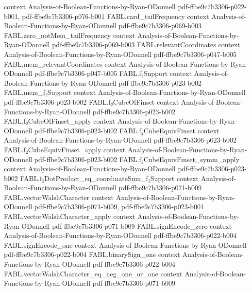 \begin{theorem}
  {context}
  {Analysis-of-Boolean-Functions-by-Ryan-ODonnell}
  {pdf-ffbe9c7b3306-p022-b001,
    pdf-ffbe9c7b3306-p076-b001}
\proofstep
  {FABL.card_tailFrequency}
  {context}
  {Analysis-of-Boolean-Functions-by-Ryan-ODonnell}
  {pdf-ffbe9c7b3306-p069-b003}
\proofstep
  {FABL.zero_notMem_tailFrequency}
  {context}
  {Analysis-of-Boolean-Functions-by-Ryan-ODonnell}
  {pdf-ffbe9c7b3306-p069-b003}
\proofstep
  {FABL.relevantCoordinates}
  {context}
  {Analysis-of-Boolean-Functions-by-Ryan-ODonnell}
  {pdf-ffbe9c7b3306-p047-b005}
\proofstep
  {FABL.mem_relevantCoordinates}
  {context}
  {Analysis-of-Boolean-Functions-by-Ryan-ODonnell}
  {pdf-ffbe9c7b3306-p047-b005}
\proofstep
  {FABL.f₂Support}
  {context}
  {Analysis-of-Boolean-Functions-by-Ryan-ODonnell}
  {pdf-ffbe9c7b3306-p023-b002}
\proofstep
  {FABL.mem_f₂Support}
  {context}
  {Analysis-of-Boolean-Functions-by-Ryan-ODonnell}
  {pdf-ffbe9c7b3306-p023-b002}
\proofstep
  {FABL.f₂CubeOfFinset}
  {context}
  {Analysis-of-Boolean-Functions-by-Ryan-ODonnell}
  {pdf-ffbe9c7b3306-p023-b002}
\proofstep
  {FABL.f₂CubeOfFinset_apply}
  {context}
  {Analysis-of-Boolean-Functions-by-Ryan-ODonnell}
  {pdf-ffbe9c7b3306-p023-b002}
\proofstep
  {FABL.f₂CubeEquivFinset}
  {context}
  {Analysis-of-Boolean-Functions-by-Ryan-ODonnell}
  {pdf-ffbe9c7b3306-p023-b002}
\proofstep
  {FABL.f₂CubeEquivFinset_apply}
  {context}
  {Analysis-of-Boolean-Functions-by-Ryan-ODonnell}
  {pdf-ffbe9c7b3306-p023-b002}
\proofstep
  {FABL.f₂CubeEquivFinset_symm_apply}
  {context}
  {Analysis-of-Boolean-Functions-by-Ryan-ODonnell}
  {pdf-ffbe9c7b3306-p023-b002}
\proofstep
  {FABL.f₂DotProduct_eq_coordinateSum_f₂Support}
  {context}
  {Analysis-of-Boolean-Functions-by-Ryan-ODonnell}
  {pdf-ffbe9c7b3306-p071-b009}
\proofstep
  {FABL.vectorWalshCharacter}
  {context}
  {Analysis-of-Boolean-Functions-by-Ryan-ODonnell}
  {pdf-ffbe9c7b3306-p071-b009,
    pdf-ffbe9c7b3306-p023-b001}
\proofstep
  {FABL.vectorWalshCharacter_apply}
  {context}
  {Analysis-of-Boolean-Functions-by-Ryan-ODonnell}
  {pdf-ffbe9c7b3306-p071-b009}
\proofstep
  {FABL.signEncode_zero}
  {context}
  {Analysis-of-Boolean-Functions-by-Ryan-ODonnell}
  {pdf-ffbe9c7b3306-p022-b004}
\proofstep
  {FABL.signEncode_one}
  {context}
  {Analysis-of-Boolean-Functions-by-Ryan-ODonnell}
  {pdf-ffbe9c7b3306-p022-b004}
\proofstep
  {FABL.binarySign_one}
  {context}
  {Analysis-of-Boolean-Functions-by-Ryan-ODonnell}
  {pdf-ffbe9c7b3306-p022-b004}
\proofstep
  {FABL.vectorWalshCharacter_eq_neg_one_or_one}
  {context}
  {Analysis-of-Boolean-Functions-by-Ryan-ODonnell}
  {pdf-ffbe9c7b3306-p071-b009}

\end{theorem}
